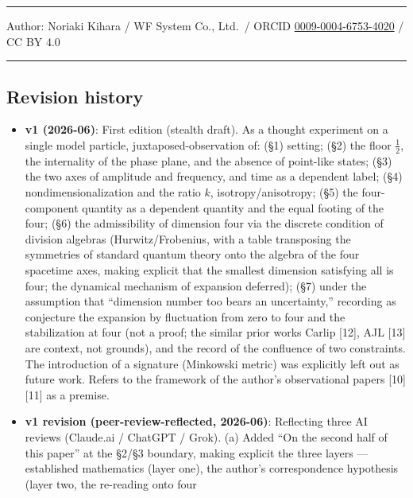 \documentclass[
]{article}
\providecommand{\tightlist}{%
  \setlength{\itemsep}{0pt}\setlength{\parskip}{0pt}}
\begin{document}
\begin{center}\rule{0.5\linewidth}{0.5pt}\end{center}

Author: Noriaki Kihara / WF System Co., Ltd.~/ ORCID
\href{https://orcid.org/0009-0004-6753-4020}{0009-0004-6753-4020} / CC
BY 4.0

\begin{center}\rule{0.5\linewidth}{0.5pt}\end{center}

\subsection{Revision history}\label{revision-history}

\begin{itemize}
\tightlist
\item
  \textbf{v1 (2026-06)}: First edition (stealth draft). As a thought
  experiment on a single model particle, juxtaposed-observation of: (§1)
  setting; (§2) the floor \(\tfrac12\), the internality of the phase
  plane, and the absence of point-like states; (§3) the two axes of
  amplitude and frequency, and time as a dependent label; (§4)
  nondimensionalization and the ratio \(k\), isotropy/anisotropy; (§5)
  the four-component quantity as a dependent quantity and the equal
  footing of the four; (§6) the admissibility of dimension four via the
  discrete condition of division algebras (Hurwitz/Frobenius, with a
  table transposing the symmetries of standard quantum theory onto the
  algebra of the four spacetime axes, making explicit that the smallest
  dimension satisfying all is four; the dynamical mechanism of expansion
  deferred); (§7) under the assumption that ``dimension number too bears
  an uncertainty,'' recording as conjecture the expansion by fluctuation
  from zero to four and the stabilization at four (not a proof; the
  similar prior works Carlip {[}12{]}, AJL {[}13{]} are context, not
  grounds), and the record of the confluence of two constraints. The
  introduction of a signature (Minkowski metric) was explicitly left out
  as future work. Refers to the framework of the author's observational
  papers {[}10{]}{[}11{]} as a premise.
\item
  \textbf{v1 revision (peer-review-reflected, 2026-06)}: Reflecting
  three AI reviews (Claude.ai / ChatGPT / Grok). (a) Added ``On the
  second half of this paper'' at the §2/§3 boundary, making explicit the
  three layers --- established mathematics (layer one), the author's
  correspondence hypothesis (layer two, the re-reading onto four

\end{itemize}
\end{document}
